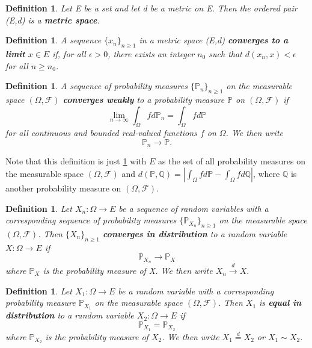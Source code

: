 \documentclass[honours,12pt,twoside, openright]{unswthesis}
\newcommand{\PP}{\mathbb{P}}
\newcommand{\1}{\mathbf 1}
\newcommand{\FF}{\mathcal{F}}
\newtheorem{definition}[equation]{Definition}
\numberwithin{equation}{section}
\theoremstyle{definition}
\theoremstyle{remark}
\begin{document}
\begin{definition}
Let E be a set and let d be a metric on E. Then the ordered pair (E,d) is a \textbf{metric space}.\\
\end{definition}

\begin{definition}\label{def:metricConvergence}
A sequence $\{x_n\}_{n\geq1}$ in a metric space (E,d) \textbf{converges to a limit} $x\in E$ if, for all $\epsilon>0$, there exists an integer $n_0$ such that $d(x_n,x)<\epsilon$ for all $n\geq n_0$.\\
\end{definition}

\begin{definition}
A sequence of probability measures $\{\PP_n\}_{n \geq 1}$ on the measurable space $(\Omega, \FF)$ \textbf{converges weakly} to a probability measure $\PP$ on $(\Omega, \FF)$ if
\[
\lim_{n\rightarrow \infty} \int_\Omega fd\PP_n = \int_\Omega fd\PP
\]
for all continuous and bounded real-valued functions $f$ on $\Omega$. We then write \[\PP_n\rightarrow\PP.\]
\end{definition}
\noindent Note that this definition is just \ref{def:metricConvergence} with $E$ as the set of all probability measures on the measurable space $(\Omega, \FF)$ and $d(\PP,\mathbb{Q})=|\int_\Omega fd\PP- \int_\Omega fd\mathbb{Q}|$, where $\mathbb{Q}$ is another probability measure on $(\Omega, \FF).$\\

\begin{definition}
Let $X_n:\Omega\to E$ be a sequence of random variables with a corresponding sequence of probability measures $\{\PP_{X_n}\}_{n\geq 1}$ on the measurable space $(\Omega, \FF)$. Then $\{X_n\}_{n\geq 1}$ \textbf{converges in distribution} to a random variable $X:\Omega\to E$ if 
\[
\PP_{X_n} \to \PP_X
\] where $\PP_X$ is the probability measure of X. We then write $X_n \overset{d}{\to}X.$\\
\end{definition}

\begin{definition}\label{def:equalDist}
Let $X_1:\Omega\to E$ be a  random variable with a corresponding probability measure $\PP_{X_1}$ on the measurable space $(\Omega, \FF)$. Then $X_1$ is \textbf{equal in distribution} to a random variable $X_2:\Omega\to E$ if 
\[\PP_{X_1} = \PP_{X_2} \] where $\PP_{X_2}$ is the probability measure of $X_2$. We then write $X_1 \overset{d}{=}X_2$ or $X_1 \sim X_2$.\\
\end{definition}
\end{document}

